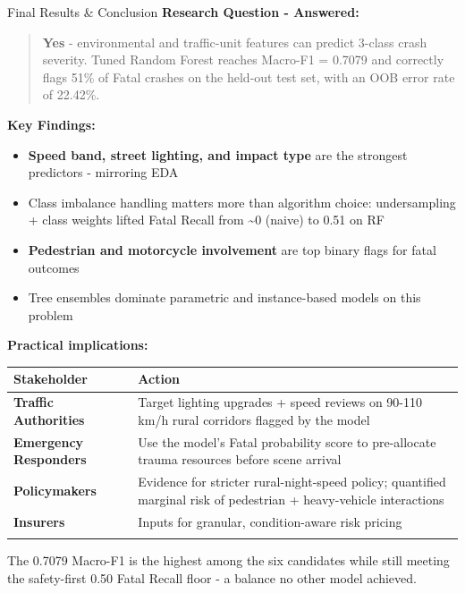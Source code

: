 \documentclass[
  ignorenonframetext,
]{beamer}
\providecommand{\tightlist}{%
  \setlength{\itemsep}{0pt}\setlength{\parskip}{0pt}}
\begin{document}
\begin{frame}{Final Results \& Conclusion}
\label{final-results-conclusion}
\textbf{Research Question - Answered:}

\begin{quote}
\textbf{Yes} - environmental and traffic-unit features can predict
3-class crash severity. Tuned Random Forest reaches Macro-F1 = 0.7079
and correctly flags 51\% of Fatal crashes on the held-out test set, with
an OOB error rate of 22.42\%.
\end{quote}

\textbf{Key Findings:}

\begin{itemize}
\tightlist
\item
  \textbf{Speed band, street lighting, and impact type} are the
  strongest predictors - mirroring EDA
\item
  Class imbalance handling matters more than algorithm choice:
  undersampling + class weights lifted Fatal Recall from
  \textasciitilde0 (naive) to 0.51 on RF
\item
  \textbf{Pedestrian and motorcycle involvement} are top binary flags
  for fatal outcomes
\item
  Tree ensembles dominate parametric and instance-based models on this
  problem
\end{itemize}

\textbf{Practical implications:}

\begin{longtable}[]{@{}
  >{\raggedright\arraybackslash}p{}
  >{\raggedright\arraybackslash}p{}@{}}
\toprule\noalign{}
\begin{minipage}[b]{\linewidth}\raggedright
Stakeholder
\end{minipage} & \begin{minipage}[b]{\linewidth}\raggedright
Action
\end{minipage} \\
\midrule\noalign{}
\endhead
\textbf{Traffic Authorities} & Target lighting upgrades + speed reviews
on 90-110 km/h rural corridors flagged by the model \\
\textbf{Emergency Responders} & Use the model's Fatal probability score
to pre-allocate trauma resources before scene arrival \\
\textbf{Policymakers} & Evidence for stricter rural-night-speed policy;
quantified marginal risk of pedestrian + heavy-vehicle interactions \\
\textbf{Insurers} & Inputs for granular, condition-aware risk pricing \\
\bottomrule\noalign{}
\end{longtable}

The 0.7079 Macro-F1 is the highest among the six candidates while still
meeting the safety-first 0.50 Fatal Recall floor - a balance no other
model achieved.
\end{frame}
\end{document}

